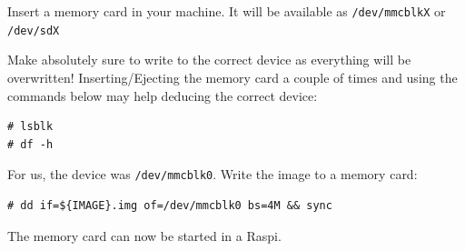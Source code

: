 

Insert a memory card in your machine. It will be available as
\texttt{/dev/mmcblkX} or \texttt{/dev/sdX}

Make absolutely sure to write to the correct device as everything will be 
overwritten!
Inserting/Ejecting the memory card a couple of times and using the commands
below may help deducing the correct device:

\begin{lstlisting}[]
# lsblk
# df -h
\end{lstlisting}
\FloatBarrier
\vspace{-5mm}

For us, the device was \texttt{/dev/mmcblk0}. Write the image to a memory card:
\begin{lstlisting}[]
# dd if=${IMAGE}.img of=/dev/mmcblk0 bs=4M && sync
\end{lstlisting}
\FloatBarrier
\vspace{-5mm}

The memory card can now be started in a \ac{Raspi}.

